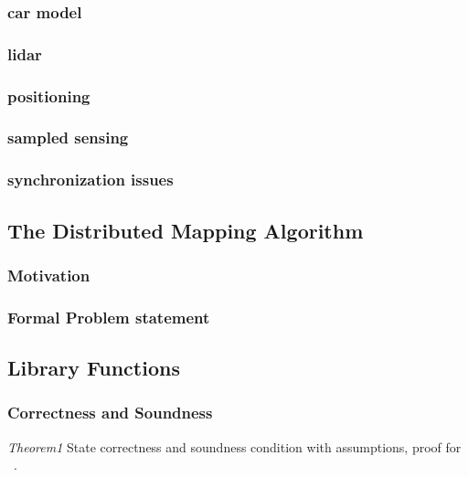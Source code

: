 \subsubsection{car model}
\subsubsection{lidar}
\subsubsection{positioning}
\subsubsection{sampled sensing}
\subsubsection{synchronization issues}
 
\subsection{The Distributed Mapping Algorithm}
\subsubsection{Motivation}
\subsubsection{Formal Problem statement}
\subsection{Library Functions}


\subsubsection{Correctness and Soundness}
\emph{Theorem1} State correctness and soundness condition with assumptions, proof for ~. 

